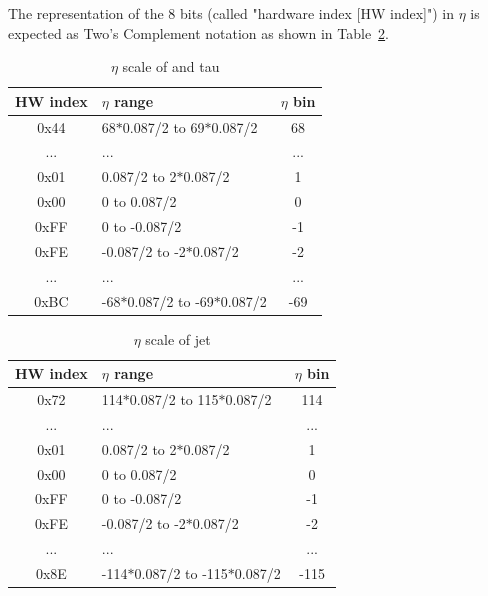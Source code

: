 The representation of the 8 bits (called "hardware index [HW index]") in $\eta$ is expected as Two's Complement notation as shown in Table~\ref{tab:gtl:calo_eta_scale}.\\
 
\begin{table}[htdp]
\caption{$\eta$ scale of \egamma and tau}
\begin{center}
\begin{tabular}{|c|l|c|}\hline
\textbf{HW index}& \textbf{$\eta$ range} & \textbf{$\eta$ bin}\\\hline\hline
0x44 & 68$*$0.087/2 to 69$*$0.087/2 & 68\\\hline
... & ... & ...\\\hline
0x01 & 0.087/2 to 2$*$0.087/2 & 1\\\hline
0x00 & 0 to 0.087/2 & 0\\\hline
0xFF & 0 to -0.087/2 & -1\\\hline
0xFE & -0.087/2 to -2$*$0.087/2 & -2\\\hline
... & ... & ...\\\hline
0xBC & -68$*$0.087/2 to -69$*$0.087/2 & -69\\\hline
\end{tabular}
\end{center}
\label{tab:gtl:calo_eta_scale}
\end{table}

\begin{table}[htdp]
\caption{$\eta$ scale of jet}
\begin{center}
\begin{tabular}{|c|l|c|}\hline
\textbf{HW index}& \textbf{$\eta$ range} & \textbf{$\eta$ bin}\\\hline\hline
0x72 & 114$*$0.087/2 to 115$*$0.087/2 & 114\\\hline
... & ... & ...\\\hline
0x01 & 0.087/2 to 2$*$0.087/2 & 1\\\hline
0x00 & 0 to 0.087/2 & 0\\\hline
0xFF & 0 to -0.087/2 & -1\\\hline
0xFE & -0.087/2 to -2$*$0.087/2 & -2\\\hline
... & ... & ...\\\hline
0x8E & -114$*$0.087/2 to -115$*$0.087/2 & -115\\\hline
\end{tabular}
\end{center}
\label{tab:gtl:calo_eta_scale}
\end{table}

